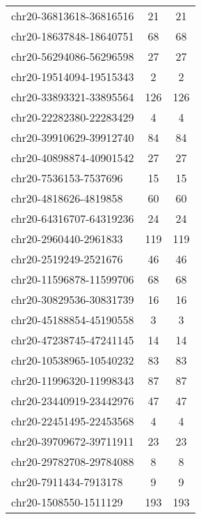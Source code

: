 \begin{longtable}{lSS}
	chr20-36813618-36816516 & 21     & 21                          \\
	chr20-18637848-18640751 & 68     & 68                          \\
	chr20-56294086-56296598 & 27     & 27                          \\
	chr20-19514094-19515343 & 2      & 2                           \\
	chr20-33893321-33895564 & 126    & 126                         \\
	chr20-22282380-22283429 & 4      & 4                           \\
	chr20-39910629-39912740 & 84     & 84                          \\
	chr20-40898874-40901542 & 27     & 27                          \\
	chr20-7536153-7537696   & 15     & 15                          \\
	chr20-4818626-4819858   & 60     & 60                          \\
	chr20-64316707-64319236 & 24     & 24                          \\
	chr20-2960440-2961833   & 119    & 119                         \\
	chr20-2519249-2521676   & 46     & 46                          \\
	chr20-11596878-11599706 & 68     & 68                          \\
	chr20-30829536-30831739 & 16     & 16                          \\
	chr20-45188854-45190558 & 3      & 3                           \\
	chr20-47238745-47241145 & 14     & 14                          \\
	chr20-10538965-10540232 & 83     & 83                          \\
	chr20-11996320-11998343 & 87     & 87                          \\
	chr20-23440919-23442976 & 47     & 47                          \\
	chr20-22451495-22453568 & 4      & 4                           \\
	chr20-39709672-39711911 & 23     & 23                          \\
	chr20-29782708-29784088 & 8      & 8                           \\
	chr20-7911434-7913178   & 9      & 9                           \\
	chr20-1508550-1511129   & 193    & 193                         \\

\end{longtable}
